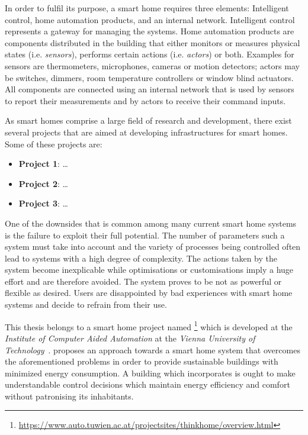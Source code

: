 In order to fulfil its purpose, a smart home requires three elements: Intelligent control, home automation products, and an internal network. Intelligent control represents a gateway for managing the systems. Home automation products are components distributed in the building that either monitors or measures physical states (i.e. \emph{sensors}), performs certain actions (i.e. \emph{actors}) or both. Examples for sensors are thermometers, microphones, cameras or motion detectors; actors may be switches, dimmers, room temperature controllers or window blind actuators. All components are connected using an internal network that is used by sensors to report their measurements and by actors to receive their command inputs.

As smart homes comprise a large field of research and development, there exist several projects that are aimed at developing infrastructures for smart homes. Some of these projects are:
\begin{itemize}
  \item \textbf{Project 1}: …
  \item \textbf{Project 2}: …
  \item \textbf{Project 3}: …
\end{itemize}

One of the downsides that is common among many current smart home systems is the failure to exploit their full potential. The number of parameters such a system must take into account and the variety of processes being controlled often lead to systems with a high degree of complexity. The actions taken by the system become inexplicable while optimisations or customisations imply a huge effort and are therefore avoided. The system proves to be not as powerful or flexible as desired. Users are disappointed by bad experiences with smart home systems and decide to refrain from their use.

This thesis belongs to a smart home project named \thinkhome\footnote{\href{https://www.auto.tuwien.ac.at/projectsites/thinkhome/overview.html}{https://www.auto.tuwien.ac.at/projectsites/thinkhome/overview.html}} which is developed at the \emph{Institute of Computer Aided Automation} at the \emph{Vienna University of Technology}~\cite{CR2011-TH_Journal,CR2010-DEST_ThinkHome}. \thinkhome proposes an approach towards a smart home system that overcomes the aforementioned problems in order to provide sustainable buildings with minimized energy consumption. A building which incorporates \thinkhome is ought to make understandable control decisions which maintain energy efficiency and comfort without patronising its inhabitants.

